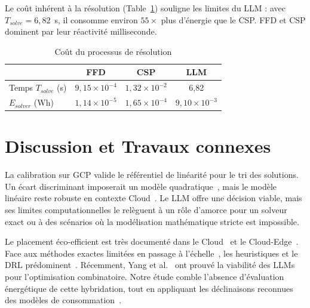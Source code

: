 ﻿\documentclass[systeme]{compas2026}
\begin{document}
Le coût inhérent à la résolution (Table~\ref{tab:solver_cost}) souligne les limites du LLM : avec $T_{solve}=6{,}82$~s, il consomme environ $55\times$ plus d'énergie que le CSP. FFD et CSP dominent par leur réactivité milliseconde.

\begin{table}[H]
    \centering
    \footnotesize
    \caption{Coût du processus de résolution}
    \label{tab:solver_cost}
    \begin{tabular}{lccc}
        \toprule
        & \textbf{FFD} & \textbf{CSP} & \textbf{LLM} \\
        \midrule
        Temps $T_{solve}$ (s) & $9{,}15\times10^{-4}$ & $1{,}32\times10^{-2}$ & 6{,}82 \\
        $E_{solver}$ (Wh) & $1{,}14\times10^{-5}$ & $1{,}65\times10^{-4}$ & $9{,}10\times10^{-3}$ \\
        \bottomrule
    \end{tabular}
\end{table}

\section{Discussion et Travaux connexes}
\label{sec:discussion_related}

La calibration sur GCP valide le référentiel de linéarité pour le tri des solutions. Un écart discriminant imposerait un modèle quadratique~\cite{iftikhar2023hunterplus}, mais le modèle linéaire reste robuste en contexte Cloud~\cite{beloglazov2012energy}. Le LLM offre une décision viable, mais ses limites computationnelles le relèguent à un rôle d'amorce pour un solveur exact ou à des scénarios où la modélisation mathématique stricte est impossible.

Le placement éco-efficient est très documenté dans le Cloud~\cite{beloglazov2012energy} et le Cloud-Edge~\cite{goudarzi2021distributed}. Face aux méthodes exactes limitées en passage à l'échelle~\cite{mann2015allocation}, les heuristiques et le DRL prédominent~\cite{goudarzi2021distributed}. Récemment, Yang et al.~\cite{yang2024large} ont prouvé la viabilité des LLMs pour l'optimisation combinatoire. Notre étude comble l'absence d'évaluation énergétique de cette hybridation, tout en appliquant les déclinaisons reconnues des modèles de consommation~\cite{adhikari2019energy}.
\end{document}
